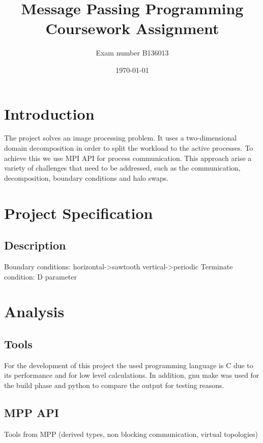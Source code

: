 \documentclass[12pt,a4paper]{article}
\newcommand{\sectionVspacing}{\vspace{15pt}}
\begin{document}
\title{Message Passing Programming Coursework Assignment}
\author{Exam number B136013}
\date{\today}

\makeEPCCtitle

\thispagestyle{empty}

\newpage
\clearpage

\tableofcontents

\newpage
\clearpage

\section{Introduction}
The project solves an image processing problem. It uses a two-dimensional domain decomposition in order to split the workload to the active processes. To achieve this we use MPI API for process communication. This approach arise a variety of challenges that need to be addressed, such as the communication, decomposition, boundary conditions and halo swaps.

\sectionVspacing

\section{Project Specification}
\subsection{Description}
Boundary conditions: horizontal->sawtooth vertical->periodic
Terminate condition: D parameter

\sectionVspacing

\section{Analysis}

\subsection{Tools}
For the development of this project the used programming language is C due to its performance and for low level calculations. In addition, gnu make was used for the build phase and python to compare the output for testing reasons.

\subsection{MPP API}
Tools from MPP (derived types, non blocking communication, virtual topologies)
\end{document}
